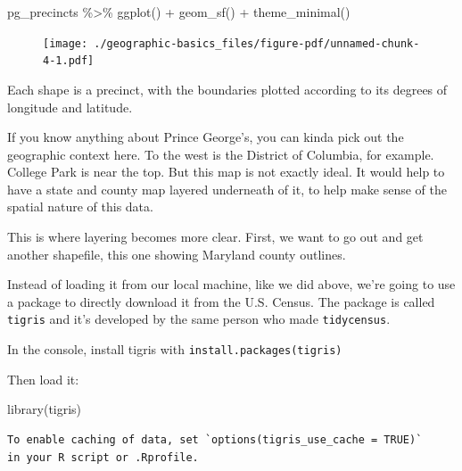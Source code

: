 \documentclass[
  letterpaper,
  DIV=11,
  numbers=noendperiod]{scrreprt}
\newenvironment{Shaded}{\begin{snugshade}}{\end{snugshade}}
\newcommand{\FunctionTok}[1]{\textcolor[rgb]{0.28,0.35,0.67}{#1}}
\newcommand{\NormalTok}[1]{\textcolor[rgb]{0.00,0.23,0.31}{#1}}
\newcommand{\SpecialCharTok}[1]{\textcolor[rgb]{0.37,0.37,0.37}{#1}}
\begin{document}
\begin{Shaded}
\begin{Highlighting}[]
\NormalTok{pg\_precincts }\SpecialCharTok{\%\textgreater{}\%}
  \FunctionTok{ggplot}\NormalTok{() }\SpecialCharTok{+}
  \FunctionTok{geom\_sf}\NormalTok{() }\SpecialCharTok{+}
  \FunctionTok{theme\_minimal}\NormalTok{()}
\end{Highlighting}
\end{Shaded}

\begin{figure}[H]

{\centering \texttt{[image: ./geographic-basics\_files/figure-pdf/unnamed-chunk-4-1.pdf]}

}

\end{figure}

Each shape is a precinct, with the boundaries plotted according to its
degrees of longitude and latitude.

If you know anything about Prince George's, you can kinda pick out the
geographic context here. To the west is the District of Columbia, for
example. College Park is near the top. But this map is not exactly
ideal. It would help to have a state and county map layered underneath
of it, to help make sense of the spatial nature of this data.

This is where layering becomes more clear. First, we want to go out and
get another shapefile, this one showing Maryland county outlines.

Instead of loading it from our local machine, like we did above, we're
going to use a package to directly download it from the U.S. Census. The
package is called \texttt{tigris} and it's developed by the same person
who made \texttt{tidycensus}.

In the console, install tigris with
\texttt{install.packages(\textquotesingle{}tigris\textquotesingle{})}

Then load it:

\begin{Shaded}
\begin{Highlighting}[]
\FunctionTok{library}\NormalTok{(tigris)}
\end{Highlighting}
\end{Shaded}

\begin{verbatim}
To enable caching of data, set `options(tigris_use_cache = TRUE)`
in your R script or .Rprofile.
\end{verbatim}
\end{document}
